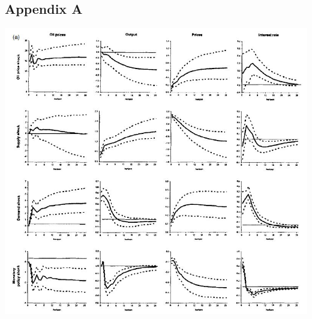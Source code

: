 \documentclass[11pt,preprint, authoryear]{elsarticle}
\let\origfigure\figure
\let\endorigfigure\endfigure
\renewenvironment{figure}[1][2] {
    \expandafter\origfigure\expandafter[H]
} {
    \endorigfigure
}
\numberwithin{equation}{section}
\numberwithin{figure}{section}
\numberwithin{table}{section}
\begin{document}
\hypertarget{appendix-a}{%
\subsection*{Appendix A}\label{appendix-a}}

\begin{figure}
\centering
\includegraphics{Capture.jpg}
\caption{Peersman orignial results}
\end{figure}


\end{document}
